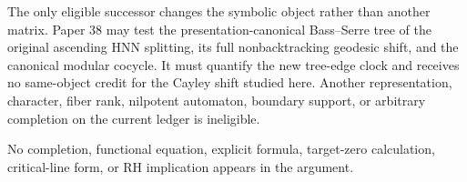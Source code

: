 The only eligible successor changes the symbolic object rather than another
matrix.  Paper 38 may test the presentation-canonical Bass--Serre tree of the
original ascending HNN splitting, its full nonbacktracking geodesic shift, and
the canonical modular cocycle.  It must quantify the new tree-edge clock and
receives no same-object credit for the Cayley shift studied here.  Another
representation, character, fiber rank, nilpotent automaton, boundary support,
or arbitrary completion on the current ledger is ineligible.

No completion, functional equation, explicit formula, target-zero
calculation, critical-line form, or RH implication appears in the argument.
